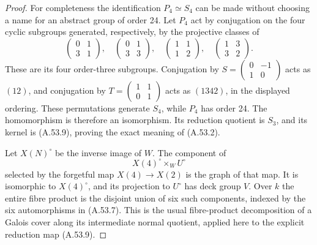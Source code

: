 \begin{proof}
For completeness the identification $P_4\simeq S_4$ can be made
without choosing a name for an abstract group of order 24.
Let $P_4$ act by conjugation on the four cyclic subgroups generated,
respectively, by the projective classes of
\[
 \begin{pmatrix}0&1\\3&1\end{pmatrix},\quad
 \begin{pmatrix}0&1\\3&3\end{pmatrix},\quad
 \begin{pmatrix}1&1\\1&2\end{pmatrix},\quad
 \begin{pmatrix}1&3\\3&2\end{pmatrix}.
\tag{A.53.10}
\]
These are its four order-three subgroups.  Conjugation by
$S=\left(\begin{smallmatrix}0&-1\\1&0\end{smallmatrix}\right)$
acts as $(12)$, and conjugation by
$T=\left(\begin{smallmatrix}1&1\\0&1\end{smallmatrix}\right)$
acts as $(1342)$, in the displayed ordering.  These permutations
generate $S_4$, while $P_4$ has order 24.  The homomorphism is
therefore an isomorphism.  Its reduction quotient is $S_3$, and
its kernel is (A.53.9), proving the exact meaning of (A.53.2).

Let $X(N)^\circ$ be the inverse image of $W$.  The component of
\[
                 X(4)^\circ\times_W U^\circ
\tag{A.53.11}
\]
selected by the forgetful map $X(4)\to X(2)$ is the graph of that
map.  It is isomorphic to $X(4)^\circ$, and its projection to
$U^\circ$ has deck group $V$.  Over $k$ the entire fibre product
is the disjoint union of six such components, indexed by the six
automorphisms in (A.53.7).  This is the usual fibre-product
decomposition of a Galois cover along its intermediate normal
quotient, applied here to the explicit reduction map (A.53.9).


\end{proof}
